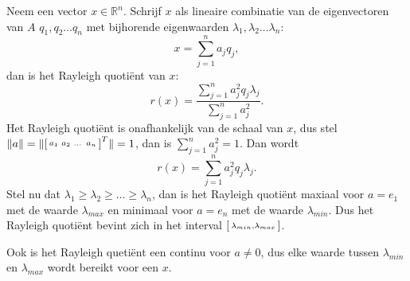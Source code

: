 Neem een vector $x \in \mathbb{R}^n$. Schrijf $x$ als lineaire combinatie van de eigenvectoren van $A$ $q_1, q_2 \dots q_n$ met bijhorende eigenwaarden $\lambda_1, \lambda_2 \dots \lambda_n$:
$$ x = \sum_{j=1}^{n}a_jq_j,$$
dan is het Rayleigh quoti\"ent van $x$:
$$r(x) = \frac{\sum_{j=1}^{n}a_j^2q_j\lambda_j}{\sum_{j=1}^{n}a_j^2}.$$
Het Rayleigh quoti\"ent is onafhankelijk van de schaal van $x$, dus stel $\lVert a \rVert = \lVert \begin{bsmallmatrix} a_1&a_2&\dots&a_n\end{bsmallmatrix}^T \rVert = 1$, dan is $\sum_{j=1}^{n}a_j^2 = 1$. Dan wordt
$$r(x) = \sum_{j=1}^{n}a_j^2q_j\lambda_j.$$
Stel nu dat $\lambda_1 \geq \lambda_2 \geq \dots \geq \lambda_n$, dan is het Rayleigh quoti\"ent maxiaal voor $a = e_1$ met de waarde $\lambda_{max}$ en minimaal voor $a = e_n$ met de waarde $\lambda_{min}$. Dus het Rayleigh quoti\"ent bevint zich in het interval $\begin{bsmallmatrix}\lambda_{min},\lambda_{max}\end{bsmallmatrix}$.

Ook is het Rayleigh queti\"ent een continu voor $a \neq 0$, dus elke waarde tussen $\lambda_{min}$ en $\lambda_{max}$ wordt bereikt voor een $x$.